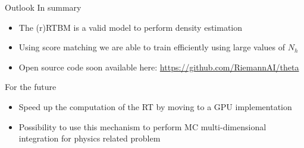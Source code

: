 \documentclass[10pt]{beamer}
\begin{document}
\begin{frame}{Outlook}
    In summary
    \begin{itemize}
        \item The (r)RTBM is a valid model to perform density estimation
        \item Using score matching we are able to train efficiently using large values of $N_h$
        \item Open source code soon available here: \url{https://github.com/RiemannAI/theta}
    \end{itemize}
    
    For the future
    \begin{itemize}
        \item Speed up the computation of the RT by moving to a GPU implementation
        \item Possibility to use this mechanism to perform MC multi-dimensional integration for physics related problem
    \end{itemize}
\end{frame}




\end{document}
